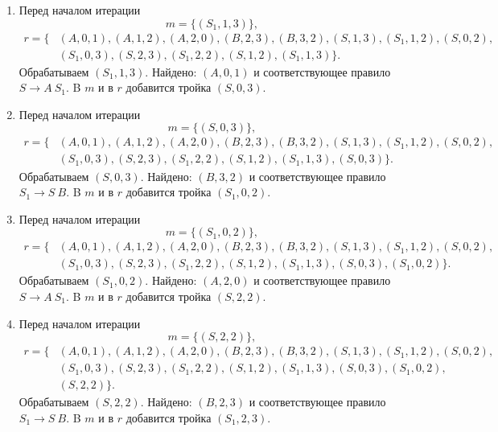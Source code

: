 \begin{example}
\begin{enumerate}
   \item
   Перед началом итерации 
     $$
     m = \{(S_1, 1, 3)\},
     $$ 
     \begin{align*}
     r= \{&(A,0,1),(A,1,2),(A,2,0),(B,2,3),(B,3,2),(S,1,3),(S_1, 1, 2),(S, 0, 2),\\
          &(S_1, 0, 3),(S, 2, 3),(S_1, 2, 2),(S, 1, 2),(S_1, 1, 3)\}.
     \end{align*}
     Обрабатываем $(S_1, 1, 3)$. 
     Найдено: $(A,0,1)$ и соответствующее правило $S \to A \ S_1$. 
     B $m$ и в $r$ добавится тройка $(S, 0, 3)$. 

   \item
   Перед началом итерации 
     $$
     m = \{(S, 0, 3)\},
     $$ 
     \begin{align*}
     r= \{&(A,0,1),(A,1,2),(A,2,0),(B,2,3),(B,3,2),(S,1,3),(S_1, 1, 2),(S, 0, 2),\\
          &(S_1, 0, 3),(S, 2, 3),(S_1, 2, 2),(S, 1, 2),(S_1, 1, 3),(S, 0, 3)\}.
     \end{align*}
     Обрабатываем $(S, 0, 3)$. 
     Найдено: $(B,3,2)$ и соответствующее правило $S_1 \to S \ B$. 
     B $m$ и в $r$ добавится тройка $(S_1, 0, 2)$. 

   \item
   Перед началом итерации 
     $$
     m = \{(S_1, 0, 2)\},
     $$ 
     \begin{align*}
     r= \{&(A,0,1),(A,1,2),(A,2,0),(B,2,3),(B,3,2),(S,1,3),(S_1, 1, 2),(S, 0, 2),\\
          &(S_1, 0, 3),(S, 2, 3),(S_1, 2, 2),(S, 1, 2),(S_1, 1, 3),(S, 0, 3),(S_1, 0, 2)\}.
     \end{align*}
     Обрабатываем $(S_1, 0, 2)$. 
     Найдено: $(A,2,0)$ и соответствующее правило $S \to A \ S_1$. 
     B $m$ и в $r$ добавится тройка $(S, 2, 2)$. 

   \item
   Перед началом итерации 
     $$
     m = \{(S, 2, 2)\},
     $$ 
     \begin{align*}
     r= \{&(A,0,1),(A,1,2),(A,2,0),(B,2,3),(B,3,2),(S,1,3),(S_1, 1, 2),(S, 0, 2),\\
          &(S_1, 0, 3),(S, 2, 3),(S_1, 2, 2),(S, 1, 2),(S_1, 1, 3),(S, 0, 3),(S_1, 0, 2),\\
          &(S, 2, 2)\}.
     \end{align*}
     Обрабатываем $(S, 2, 2)$. 
     Найдено: $(B,2,3)$ и соответствующее правило $S_1 \to S \ B$. 
     B $m$ и в $r$ добавится тройка $(S_1, 2, 3)$. 


\end{enumerate}
\end{example}
